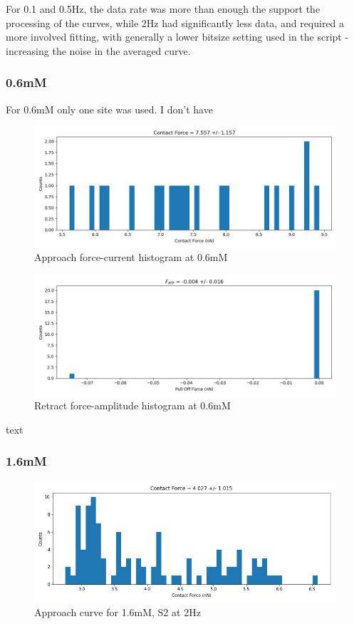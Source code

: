 For 0.1 and 0.5Hz, the data rate was more than enough the support the processing of the curves, while 2Hz had significantly less data, and required a more involved fitting, with generally a lower bitsize setting used in the script - increasing the noise in the averaged curve.


\subsubsection*{0.6mM}
For 0.6mM only one site was used. I don't have
\begin{figure}[h!]
\centering
\includegraphics[width=\textwidth]{chapter7/Tip speed/0.6mM/approach_f_c_hist.jpg}
\caption{Approach force-current histogram at 0.6mM}
\end{figure}

\begin{figure}[h!]
\centering
\includegraphics[width=\textwidth]{chapter7/Tip speed/0.6mM/retract_f_a_hist.jpg}
\caption{Retract force-amplitude histogram at 0.6mM}
\end{figure}
text
\newpage

\subsubsection*{1.6mM}
\begin{figure}[h!]
\centering
\includegraphics[width=\textwidth]{chapter7/Tip speed/1.6mM/S1 2Hz/approach_f_c_hist.jpg}
\caption{Approach curve for 1.6mM, S2 at 2Hz}
\end{figure}

